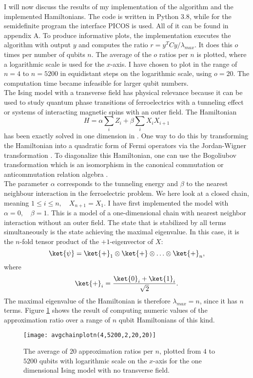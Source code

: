 I will now discuss the results of my implementation of the algorithm and the implemented Hamiltonians.
The code is written in Python 3.8, while for the semidefinite program the interface PICOS is used.
All of it can be found in appendix A.
To produce informative plots, the implementation executes the algorithm with output $y$ and computes the ratio $r=y^{T}Cy/\lambda_{max}$.
It does this $o$ times per number of qubits $n$.
The average of the $o$ ratios per $n$ is plotted, where a logarithmic scale is used for the $x$-axis.
I have chosen to plot in the range of $n=4$ to $n=5200$ in equidistant steps on the logarithmic scale, using $o=20$.
The computation time became infeasible for larger qubit numbers.\\
The Ising model with a transverse field has physical relevance because it can be used to study quantum phase transitions of ferroelectrics with a tunneling effect or systems of interacting magnetic spins with an outer field.
The Hamiltonian
\[
H=\alpha \sum_{i} Z_i + \beta \sum_{i} X_iX_{i+1}
\]
has been exactly solved in one dimension in \cite{pfeuty70}.
One way to do this by transforming the Hamiltonian into a quadratic form of Fermi operators via the Jordan-Wigner transformation \cite{nielsen05}.
To diagonalize this Hamiltonian, one can use the Bogoliubov transformation which is an isomorphism in the canonical commutation or anticommutation relation algebra \cite{bogoljubov58}.\\
The parameter $\alpha$ corresponds to the tunneling energy and $\beta$ to the nearest neighbour interaction in the ferroelectric problem.
We here look at a closed chain, meaning $1\le i \le n, \quad X_{n+1}=X_{1}$.
I have first implemented the model with $\alpha =0, \quad \beta =1$.
This is a model of a one-dimensional chain with nearest neighbor interaction without an outer field.
The state that is stabilized by all terms simultaneously is the state achieving the maximal eigenvalue.
In this case, it is the $n$-fold tensor product of the $+1$-eigenvector of $X$: \[
	\ket{\psi}= \ket{+}_1\otimes\ket{+}\otimes\ldots\otimes\ket{+}_n
,\] where \[
\ket{+}_i= \frac{\ket{0}_i+\ket{1}_i}{\sqrt{2}}
.\]
The maximal eigenvalue of the Hamiltonian is therefore $\lambda_{max}=n$, since it has $n$ terms.
Figure \ref{fig:1} shows the result of computing numeric values of the approximation ratio over a range of $n$ qubit Hamiltonians of this kind.
\begin{figure}[H]
	\centering
	\texttt{[image: avgchainplotn(4,5200,2,20,20)]}
	\caption{The average of $20$ approximation ratios per $n$, plotted from $4$ to $5200$ qubits with logarithmic scale on the $x$-axis for the one dimensional Ising model with no transverse field.}
	\label{fig:1}
\end{figure}
